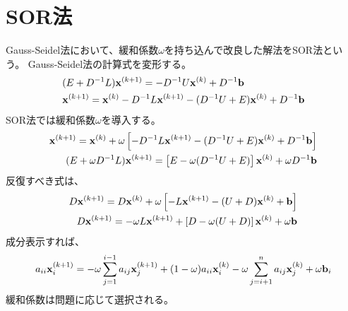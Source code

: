 \documentclass{jsarticle}
\newcommand{\kakko}[1][]{(#1)}
\newcommand{\bx}{\bold{x}}
\newcommand{\bb}{\bold{b}}
\begin{document}
\section{SOR法}
Gauss-Seidel法において、緩和係数$\omega$を持ち込んで改良した解法をSOR法という。
Gauss-Seidel法の計算式を変形する。
\begin{align}
&    (E + D^{-1}L)\bx^{\kakko[k+1]} = - D^{-1} U \bx^{\kakko[k]} + D^{-1}\bold{b}\\
&    \bx^{\kakko[k+1]} = \bx^{\kakko[k]}-D^{-1}L\bx^{\kakko[k+1]}- (D^{-1} U+E) \bx^{\kakko[k]} + D^{-1}\bold{b}
\end{align}
SOR法では緩和係数$\omega$を導入する。
\begin{align}
  \bx^{\kakko[k+1]} = \bx^{\kakko[k]} +\omega\left[-D^{-1}L\bx^{\kakko[k+1]}- (D^{-1} U+E) \bx^{\kakko[k]} + D^{-1}\bb \right]\\
  (E + \omega D^{-1}L)\bx^{\kakko[k+1]} = \left[E-\omega(D^{-1} U+E)\right] \bx^{\kakko[k]} + \omega D^{-1}\bb 
\end{align}
反復すべき式は、
\begin{align}
  D\bx^{\kakko[k+1]} = D\bx^{\kakko[k]} +\omega\left[-L\bx^{\kakko[k+1]}- (U+D) \bx^{\kakko[k]} + \bb \right]\\
  D\bx^{\kakko[k+1]} = - \omega L\bx^{\kakko[k+1]} +\left[D- \omega (U+D)\right] \bx^{\kakko[k]} + \omega\bb 
\end{align}
成分表示すれば、
\begin{equation}
a_{ii}\bx^{\kakko[k+1]}_i = - \omega\sum^{i-1}_{j=1} a_{ij}\bx^{\kakko[k+1]}_j + (1- \omega) a_{ii}\bx^{\kakko[k]}_i -\omega\sum^{n}_{j=i+1}a_{ij}\bx^{\kakko[k]}_j+\omega\bb_i
\end{equation}
緩和係数は問題に応じて選択される。
\end{document}

